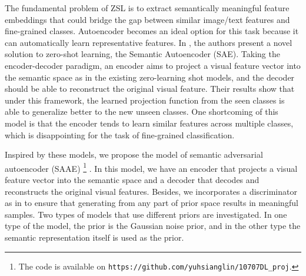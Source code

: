 \documentclass{article}
\begin{document}
The fundamental problem of ZSL is to extract semantically meaningful feature embeddings that could bridge the gap between similar image/text features and fine-grained classes. Autoencoder becomes an ideal option for this task because it can automatically learn representative features. In \cite{kodirov2017semantic}, the authors present a novel solution to zero-shot learning, the Semantic Autoencoder (SAE). Taking the encoder-decoder paradigm, an encoder aims to project a visual feature vector into the semantic space as in the existing zero-learning shot models, and the decoder should be able to reconstruct the original visual feature. Their results show that under this framework, the learned projection function from the seen classes is able to generalize better to the new unseen classes. One shortcoming of this model is that the encoder tends to learn similar features across multiple classes, which is disappointing for the task of fine-grained classification. 

Inspired by these models, we propose the model of semantic adversarial autoencoder (SAAE)%
\footnote{The code is available on \texttt{https://github.com/yuhsianglin/10707DL\_proj}.}%
. In this model, we have an encoder that projects a visual feature vector into the semantic space and a decoder that decodes and reconstructs the original visual features. Besides, we incorporates a discriminator as in \cite{makhzani2015adversarial} to ensure that generating from any part of prior space results in meaningful samples. Two types of models that use different priors are investigated. In one type of the model, the prior is the Gaussian noise prior, and in the other type the semantic representation itself is used as the prior.

\end{document}
